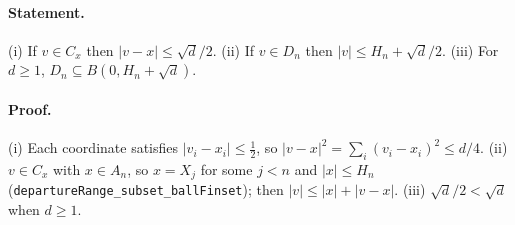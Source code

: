 \paragraph{Statement.} (i) If $v\in C_x$ then $|v-x|\le\sqrt d/2$. (ii) If $v\in D_n$ then
$|v|\le H_n+\sqrt d/2$. (iii) For $d\ge1$, $D_n\subseteq B(0,H_n+\sqrt d)$.
\paragraph{Proof.} (i) Each coordinate satisfies $|v_i-x_i|\le\tfrac12$, so
$|v-x|^2=\sum_i(v_i-x_i)^2\le d/4$. (ii) $v\in C_x$ with $x\in A_n$, so $x=X_j$ for some $j<n$ and
$|x|\le H_n$ (\texttt{departureRange\_subset\_ballFinset}); then $|v|\le|x|+|v-x|$.
(iii) $\sqrt d/2<\sqrt d$ when $d\ge1$.
